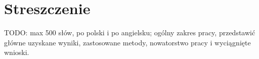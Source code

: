 \documentclass[a4paper,12pt]{article}
\author{Kołucki Rafał}
\begin{document}
\maketitle

\pagebreak

\section*{Streszczenie}
TODO: max 500 słów, po polski i po angielsku; ogólny zakres pracy, przedstawić główne uzyskane wyniki, zastosowane metody, nowatorstwo pracy i wyciągnięte wnioski.

\pagebreak

\renewcommand{\cftsecleader}{\cftdotfill{\cftdotsep}}
\tableofcontents

\vfill

\pagebreak










\end{document}

